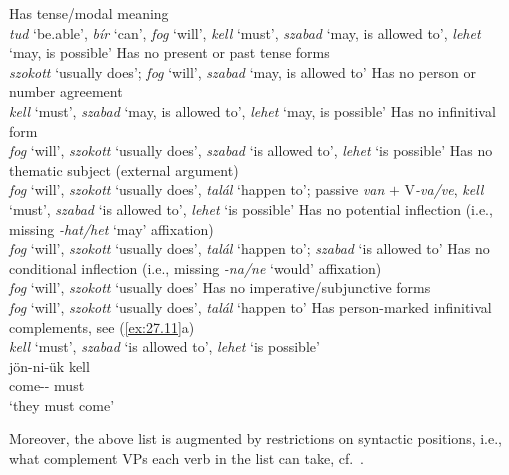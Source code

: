 \documentclass[output=paper]{langsci/langscibook}
\begin{document}
\ea\label{ex:27.3}
    Has tense/modal meaning\\
    \emph{tud} ‘be.able’, \emph{bír} ‘can’, \emph{fog} ‘will’, \emph{kell}
    ‘must’, \emph{szabad} ‘may, is allowed to’, \emph{lehet} ‘may, is possible’
\ex\label{ex:27.4}
    Has no present or past tense forms\\
    \emph{szokott} ‘usually does’; \emph{fog} ‘will’, \emph{szabad} ‘may, is
    allowed to’
\ex\label{ex:27.5}
    Has no person or number agreement\\
    \emph{kell} ‘must’, \emph{szabad} ‘may, is allowed to’, \emph{lehet} ‘may,
    is possible’
\ex\label{ex:27.6}
    Has no infinitival form\\
    \emph{fog} ‘will’, \emph{szokott} ‘usually does’, \emph{szabad} ‘is allowed
    to’, \emph{lehet} ‘is possible’
\ex\label{ex:27.7}
    Has no thematic subject (external argument)\\
    \emph{fog} ‘will’, \emph{szokott} ‘usually does’, \emph{talál} ‘happen to’;
    passive \emph{van} $+$ V\emph{-va/ve}, \emph{kell} ‘must’,
    \emph{szabad} ‘is allowed to’, \emph{lehet} ‘is possible’
\ex\label{ex:27.8}
    Has no potential inflection (i.e., missing \emph{-hat/het} ‘may’ affixation)\\
    \emph{fog} ‘will’, \emph{szokott} ‘usually does’, \emph{talál} ‘happen to’;
    \emph{szabad} ‘is allowed to’
\ex\label{ex:27.9}
    Has no conditional inflection (i.e., missing \emph{-na/ne} ‘would’
    affixation)\\
    \emph{fog} ‘will’, \emph{szokott} ‘usually does’
\ex\label{ex:27.10}
    Has no imperative/subjunctive forms\\
    \emph{fog} ‘will’, \emph{szokott} ‘usually does’, \emph{talál} ‘happen to’
\ex\label{ex:27.11}
    Has person-marked infinitival complements, see (\ref{ex:27.11}a)\\
    \emph{kell} ‘must’, \emph{szabad} ‘is allowed to’, \emph{lehet} ‘is
    possible’
    \ea {}\\
        \gll jön-ni-ük kell\\
            come-\Inf{}-\Tpl{} must\\
        \glt ‘they must come’
    \z
\z

Moreover, the above list is augmented by restrictions on syntactic positions,
i.e., what complement VPs each verb in the list can take, cf.\ .
\end{document}
